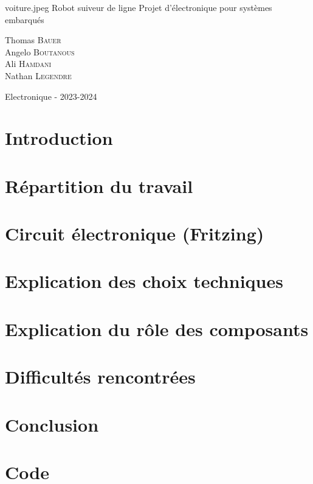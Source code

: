 \documentclass[12pt,a4paper]{article}
\begin{document}
\PageDeGarde
{voiture.jpeg} %
{Robot suiveur de ligne} %
{Projet d'électronique pour systèmes embarqués} %
{

Thomas \textsc{Bauer}\\
Angelo \textsc{Boutanous}\\
Ali \textsc{Hamdani}\\
Nathan \textsc{Legendre}\\

} %
{Electronique - 2023-2024} %


\newpage

\tableofcontents

\listoffigures

\newpage

\section{Introduction}


\section{Répartition du travail}


\section{Circuit électronique (Fritzing)}


\section{Explication des choix techniques}


\section{Explication du rôle des composants}


\section{Difficultés rencontrées}


\section{Conclusion}


\section{Code}

\end{document}
